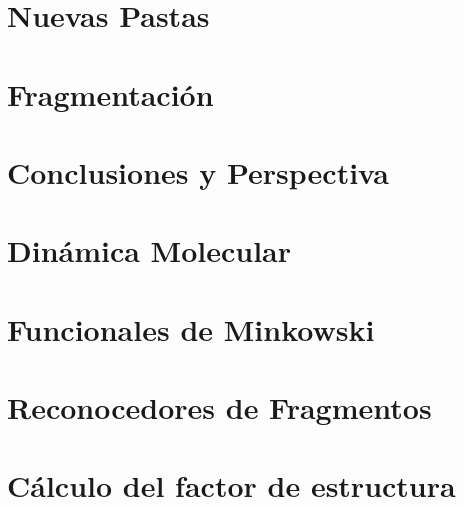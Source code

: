 \documentclass[12pt]{book}
\begin{document}
\chapter[Nuevas pastas]{Nuevas Pastas}
\label{ch:nuevas_pastas}


\chapter[Fragmentación]{Fragmentación}
\label{ch:fragmentacion}


\chapter[Conclusiones y Perspectiva]{Conclusiones y Perspectiva}
\label{ch:conclusiones}


\appendix

\chapter{Dinámica Molecular}
\label{ap:md}


\chapter{Funcionales de Minkowski}
\label{ap:minkowski}


\chapter{Reconocedores de Fragmentos}
\label{ap:reconocedores}


\chapter{Cálculo del factor de estructura}
\label{ap:sq}



\end{document}
